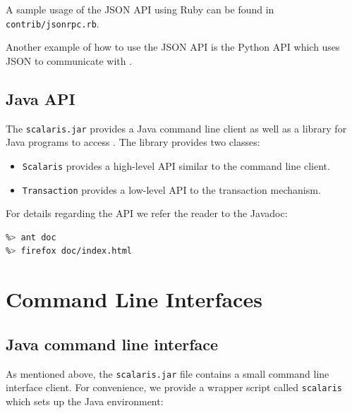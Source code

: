\documentclass[a4paper]{scrreprt}
\newcommand{\code}[1]{\lstinline[basicstyle=\ttfamily]!#1!}
\begin{document}
A sample usage of the JSON API using Ruby can be found in
\code{contrib/jsonrpc.rb}.

Another example of how to use the JSON API is the Python API which uses JSON
to communicate with \scalaris{}.


\subsection{Java API}

The \code{scalaris.jar} provides a Java command line client as well as a
library for Java programs to access \scalaris{}. The library provides two
classes:

\begin{itemize}
\item \code{Scalaris} provides a high-level API similar to the command line
       client.
\item \code{Transaction} provides a low-level API to the transaction
       mechanism.
\end{itemize}

For details regarding the API we refer the reader to the Javadoc:

\begin{lstlisting}[language=sh]
%> cd java-api
%> ant doc
%> firefox doc/index.html
\end{lstlisting}

\section{Command Line Interfaces}

\subsection{Java command line interface}

As mentioned above, the \code{scalaris.jar} file contains a small command line
interface client. For
convenience, we provide a wrapper script called \code{scalaris} which
sets up the Java environment:
\end{document}
